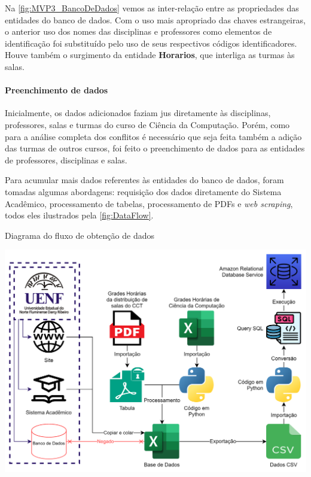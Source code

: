 Na \autoref{fig:MVP3_BancoDeDados} vemos as inter-relação entre as propriedades das entidades do banco de dados. Com o uso mais apropriado das chaves estrangeiras, o anterior uso dos nomes das disciplinas e professores como elementos de identificação foi substituído pelo uso de seus respectivos códigos identificadores. Houve também o surgimento da entidade \textbf{Horarios}, que interliga as turmas às salas.

\paragraph*{Preenchimento de dados} \label{par:preenchimento}

Inicialmente, os dados adicionados faziam jus diretamente às disciplinas, professores, salas e turmas do curso de Ciência da Computação. Porém, como para a análise completa dos conflitos é necessário que seja feita também a adição das turmas de outros cursos, foi feito o preenchimento de dados para as entidades de professores, disciplinas e salas.

Para acumular mais dados referentes às entidades do banco de dados, foram tomadas algumas abordagens: requisição dos dados diretamente do Sistema Acadêmico, processamento de tabelas, processamento de PDFs e \textit{web scraping}, todos eles ilustrados pela \autoref{fig:DataFlow}.

\begin{MyCenteredFigure}
  \caption{Diagrama do fluxo de obtenção de dados}
  \label{fig:DataFlow}
  \includegraphics[width=\textwidth]{files/img/2.02!5-desenvolvimento/2.02!5.1.4-sistema/Processamento de dados.drawio}
\end{MyCenteredFigure}

